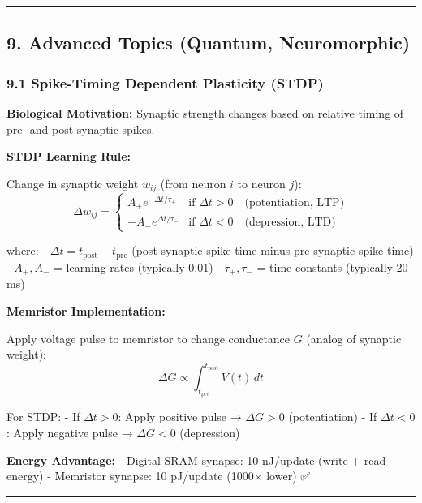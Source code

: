 \documentclass[
]{article}
\begin{document}
\begin{center}\rule{0.5\linewidth}{0.5pt}\end{center}

\hypertarget{advanced-topics-quantum-neuromorphic}{%
\subsection{9. Advanced Topics (Quantum,
Neuromorphic)}\label{advanced-topics-quantum-neuromorphic}}

\hypertarget{spike-timing-dependent-plasticity-stdp}{%
\subsubsection{9.1 Spike-Timing Dependent Plasticity
(STDP)}\label{spike-timing-dependent-plasticity-stdp}}

\textbf{Biological Motivation:} Synaptic strength changes based on
relative timing of pre- and post-synaptic spikes.

\textbf{STDP Learning Rule:}

Change in synaptic weight \(w_{ij}\) (from neuron \(i\) to neuron
\(j\)): \[
\Delta w_{ij} =
\begin{cases}
A_+ e^{-\Delta t / \tau_+} & \text{if } \Delta t > 0 \quad \text{(potentiation, LTP)} \\
-A_- e^{\Delta t / \tau_-} & \text{if } \Delta t < 0 \quad \text{(depression, LTD)}
\end{cases}
\]

where: - \(\Delta t = t_{\text{post}} - t_{\text{pre}}\) (post-synaptic
spike time minus pre-synaptic spike time) - \(A_+, A_-\) = learning
rates (typically 0.01) - \(\tau_+, \tau_-\) = time constants (typically
20 ms)

\textbf{Memristor Implementation:}

Apply voltage pulse to memristor to change conductance \(G\) (analog of
synaptic weight): \[
\Delta G \propto \int_{t_{\text{pre}}}^{t_{\text{post}}} V(t) \, dt
\]

For STDP: - If \(\Delta t > 0\): Apply positive pulse → \(\Delta G > 0\)
(potentiation) - If \(\Delta t < 0\): Apply negative pulse →
\(\Delta G < 0\) (depression)

\textbf{Energy Advantage:} - Digital SRAM synapse: 10 nJ/update (write +
read energy) - Memristor synapse: 10 pJ/update (1000× lower) ✅

\begin{center}\rule{0.5\linewidth}{0.5pt}\end{center}
\end{document}
